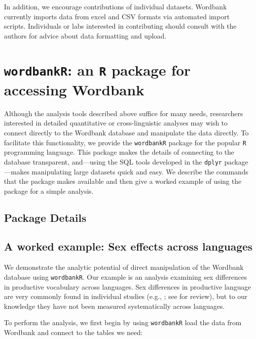\documentclass[doc,noapacite]{apa2}
\newcommand{\comment}[1]{\marginpar[]{\small \textcolor{blue}{#1}}}
\begin{document}
In addition, we encourage contributions of individual datasets. Wordbank currently imports data from excel and CSV formats via automated import scripts. Individuals or labs interested in contributing should consult with the authors for advice about data formatting and upload. \comment{MORE HERE?}

\section{\texttt{wordbankR}: an \texttt{R} package for accessing Wordbank}

Although the analysis tools described above suffice for many needs, researchers interested in detailed quantitative or cross-linguistic analyses may wish to connect directly to the Wordbank database and manipulate the data directly. To facilitate this functionality, we provide the \texttt{wordbankR} package for the popular \texttt{R} programming language. This package makes the details of connecting to the database transparent, and---using the SQL tools developed in the \texttt{dplyr} package \cite{wickham2014}---makes manipulating large datasets quick and easy. We describe the commands that the package makes available and then give a worked example of using the package for a simple analysis.

\subsection{Package Details}



\comment{TO DO: MAKE THE PACKAGE}

\subsection{A worked example: Sex effects across languages}

We demonstrate the analytic potential of direct manipulation of the Wordbank database using \texttt{wordbankR}. Our example is an analysis examining sex differences in productive vocabulary across languages. Sex differences in productive language are very commonly found in individual studies (e.g., ; see  for review), but to our knowledge they have not been measured systematically across languages. 

To perform the analysis, we first begin by using \texttt{wordbankR} load the data from Wordbank and connect to the tables we need:
\end{document}
